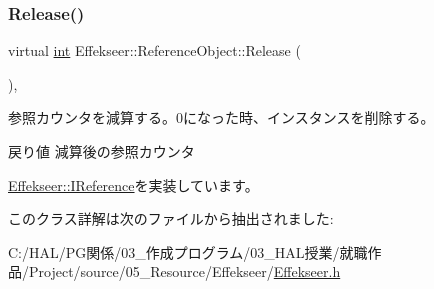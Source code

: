 \subsubsection{\texorpdfstring{Release()}{Release()}}
{\footnotesize\ttfamily virtual \mbox{\hyperlink{namespace_effekseer_ace0abf7c2e6947e519ebe8b54cbcc30a}{int}} Effekseer\+::\+Reference\+Object\+::\+Release (\begin{DoxyParamCaption}{ }\end{DoxyParamCaption})\hspace{0.3cm}{\ttfamily [inline]}, {\ttfamily [virtual]}}



参照カウンタを減算する。0になった時、インスタンスを削除する。 

\begin{DoxyReturn}{戻り値}
減算後の参照カウンタ 
\end{DoxyReturn}


\mbox{\hyperlink{class_effekseer_1_1_i_reference_ad8d601188c0f088f4748aa2da8758bb5}{Effekseer\+::\+I\+Reference}}を実装しています。



このクラス詳解は次のファイルから抽出されました\+:\begin{DoxyCompactItemize}
\item 
C\+:/\+H\+A\+L/\+P\+G関係/03\+\_\+作成プログラム/03\+\_\+\+H\+A\+L授業/就職作品/\+Project/source/05\+\_\+\+Resource/\+Effekseer/\mbox{\hyperlink{_effekseer_8h}{Effekseer.\+h}}\end{DoxyCompactItemize}
